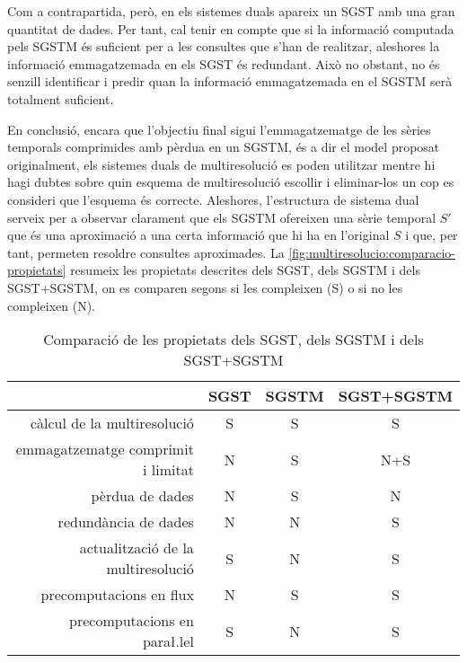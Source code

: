 Com a contrapartida, però, en els sistemes duals apareix un \gls{SGST}
amb una gran quantitat de dades. Per tant, cal tenir en compte que si
la informació computada pels \gls{SGSTM} és suficient per a les
consultes que s'han de realitzar, aleshores la informació
emmagatzemada en els \gls{SGST} és redundant. Això no obstant, no és
senzill identificar i predir quan la informació emmagatzemada en el
\gls{SGSTM} serà totalment suficient.



En conclusió, encara que l'objectiu final sigui l'emmagatzematge de
les sèries temporals comprimides amb pèrdua en un \gls{SGSTM}, és a
dir el model proposat originalment, els sistemes duals de
multiresolució es poden utilitzar mentre hi hagi dubtes sobre quin
esquema de multiresolució escollir i eliminar-los un cop es consideri
que l'esquema és correcte. Aleshores, l'estructura de sistema dual
serveix per a observar clarament que els \gls{SGSTM} ofereixen una
sèrie temporal $S'$ que és una aproximació a una certa informació que
hi ha en l'original $S$ i que, per tant, permeten resoldre consultes
aproximades. %
La \autoref{fig:multiresolucio:comparacio-propietats} resumeix les
propietats descrites dels \gls{SGST}, dels \gls{SGSTM} i dels
\gls{SGST}+\gls{SGSTM}, on es comparen segons si les compleixen (S) o
si no les compleixen (N).


\begin{table}[tp]
  \centering
  \begin{tabular}[c]{r|ccc}
  & \gls{SGST} & \gls{SGSTM} & \gls{SGST}+\gls{SGSTM}\\\hline
  càlcul de la multiresolució & S & S & S \\
  emmagatzematge comprimit i limitat & N & S & N+S\\
  pèrdua de dades & N & S & N\\
  redundància de dades & N & N & S\\ 
  actualització de la multiresolució & S & N & S\\
  precomputacions en flux & N & S & S\\
  precomputacions en para\l.lel & S & N & S\\
\end{tabular}
  \caption{Comparació de les propietats dels \gls{SGST}, dels \gls{SGSTM} i dels \gls{SGST}+\gls{SGSTM}}
  \label{fig:multiresolucio:comparacio-propietats}
\end{table}













